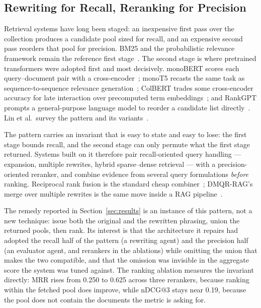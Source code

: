\subsection{Rewriting for Recall, Reranking for Precision}

Retrieval systems have long been staged: an inexpensive first pass over the
collection produces a candidate pool sized for recall, and an expensive second
pass reorders that pool for precision. BM25 and the probabilistic relevance
framework remain the reference first stage~\cite{robertson2009bm25}. The second
stage is where pretrained transformers were adopted first and most decisively.
monoBERT scores each query--document pair with a
cross-encoder~\cite{nogueira2019monobert}; monoT5 recasts the same task as
sequence-to-sequence relevance generation~\cite{nogueira2020monot5}; ColBERT
trades some cross-encoder accuracy for late interaction over precomputed term
embeddings~\cite{khattab2020colbert}; and RankGPT prompts a general-purpose
language model to reorder a candidate list
directly~\cite{sun2023rankgpt}. Lin et al.\ survey the pattern and its
variants~\cite{lin2021pretrained}.

The pattern carries an invariant that is easy to state and easy to lose: the
first stage bounds recall, and the second stage can only permute what the first
stage returned. Systems built on it therefore pair recall-oriented query handling
--- expansion, multiple rewrites, hybrid sparse--dense retrieval --- with a
precision-oriented reranker, and combine evidence from several query formulations
\emph{before} ranking. Reciprocal rank fusion is the standard cheap
combiner~\cite{cormack2009rrf}; DMQR-RAG's merge over multiple rewrites is the
same move inside a RAG pipeline~\cite{gao2024dmqr}.

The remedy reported in Section~\ref{sec:results} is an instance of this pattern,
not a new technique: issue both the original and the rewritten phrasing, union
the returned pools, then rank. Its interest is that the architecture it repairs
had adopted the recall half of the pattern (a rewriting agent) and the precision
half (an evaluator agent, and rerankers in the ablations) while omitting the
union that makes the two compatible, and that the omission was invisible in the
aggregate score the system was tuned against. The ranking ablation measures the
invariant directly: MRR rises from 0.250 to 0.625 across three rerankers, because
ranking within the fetched pool does improve, while nDCG@3 stays near 0.19,
because the pool does not contain the documents the metric is asking for.

